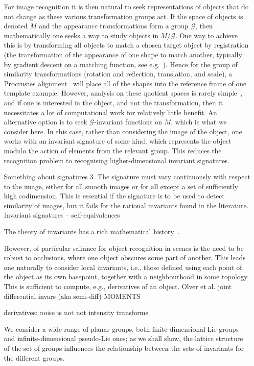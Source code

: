 \documentclass[review,onefignum,onetabnum]{siamonline190516}
\begin{document}
For image recognition it is then natural to seek representations of objects that do not change as these various transformation groups act. If the space of objects is denoted $M$ and the appearance transformations form a group $\mathcal{G}$, then mathematically one seeks a way to study objects in $M / \mathcal{G}$. One way to achieve this is by transforming all objects to match a chosen target object by registration (the transformation of the appearance of one shape to match another, typically by gradient descent on a matching function, see e.g.~\cite{}). Hence for the group of similarity transformations (rotation and reflection, translation, and scale), a Procrustes alignment~\cite{} will place all of the shapes into the reference frame of one template example. However, analysis on these quotient spaces is rarely simple~\cite{}, and if one is interested in the object, and not the transformation, then it necessitates a lot of computational work for relatively little benefit. An alternative option is to seek $\mathcal{G}$-invariant functions on $M$, which is what we consider here. In this case, rather than considering the image of the object, one works with an invariant signature of some kind, which represents the object modulo the action of elements from the relevant group. This reduces the recognition problem to recognising higher-dimensional invariant signatures. 

Something about signatures
3. The signature must vary continuously with respect to the image, either for all smooth
images or for all except a set of sufficiently high codimension. This is essential if the
signature is to be used to detect similarity of images, but it fails for the rational
invariants found in the literature.
Invariant signatures -- self-equivalences


The theory of invariants has a rich mathematical history~\cite{}. 

However, of particular saliance for object recognition in scenes is the need to be robust to occlusions, where one object obscures some part of another. This leads one naturally to consider local invariants, i.e., those defined using each point of the object as its own basepoint, together with a neighbourhood in some topology. This is sufficient to compute, e.g., derivatives of an object. 
Olver et al. joint differential invars (aka semi-diff)
MOMENTS

derivatives: noise is not
not intensity transforms

We consider a wide range of planar groups, both finite-dimensional Lie groups and infinite-dimensional pseudo-Lie ones; as we shall show, the lattice structure of the set of groups influences the relationship between the sets of invariants for the different groups.
\end{document}
